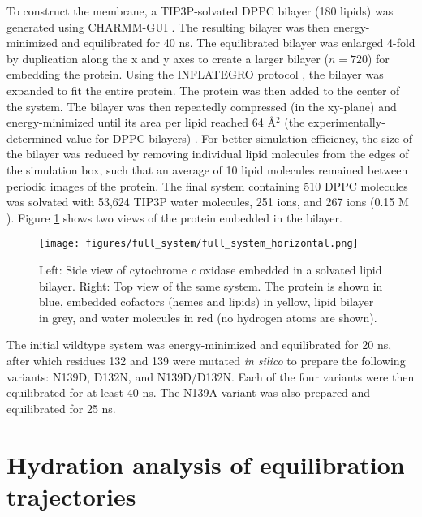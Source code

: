 To construct the membrane, a TIP3P-solvated DPPC bilayer (180 lipids) was generated using CHARMM-GUI \cite{Jo:2008p10248}. The resulting bilayer was then energy-minimized and equilibrated for 40 ns. The equilibrated bilayer was enlarged 4-fold by duplication along the x and y axes to create a larger bilayer ($n=720$) for embedding the protein. Using the INFLATEGRO protocol \cite{Kandt:2007p912}, the bilayer was expanded to fit the entire protein. The protein was then added to the center of the system. The bilayer was then repeatedly compressed (in the xy-plane) and energy-minimized until its area per lipid reached 64 Å$^2$ (the experimentally-determined value for DPPC bilayers) \cite{Taylor:2009p7408,Sonne:2007p7409}. For better simulation efficiency, the size of the bilayer was reduced by removing individual lipid molecules from the edges of the simulation box, such that an average of 10 lipid molecules remained between periodic images of the protein. The final system containing 510 DPPC molecules was solvated with 53,624 TIP3P water molecules, 251  ions, and 267  ions (0.15 M ). Figure \ref{fig:full_system} shows two views of the protein embedded in the bilayer.

\begin{figure}[htbp]
\centering
\texttt{[image: figures/full\_system/full\_system\_horizontal.png]}
\caption[Representative snapshots of cytochrome \emph{c} oxidase embedded in a solvated lipid bilayer.]{Left: Side view of cytochrome \emph{c} oxidase embedded in a solvated lipid bilayer. Right: Top view of the same system. The protein is shown in blue, embedded cofactors (hemes and lipids) in yellow, lipid bilayer in grey, and water molecules in red (no hydrogen atoms are shown).}
\label{fig:full_system}
\end{figure}

The initial wildtype system was energy-minimized and equilibrated for 20 ns, after which residues 132 and 139 were mutated \emph{in silico} to prepare the following variants: N139D, D132N, and N139D/D132N. Each of the four variants were then equilibrated for at least 40 ns. The N139A variant was also prepared and equilibrated for 25 ns.

\section{Hydration analysis of equilibration trajectories}

